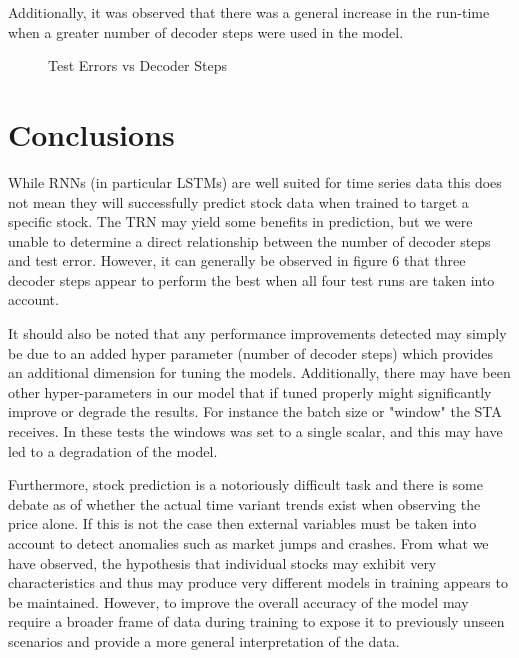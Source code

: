 \documentclass{article}
\begin{document}
    
    Additionally, it was observed that there was a general increase in the run-time when a greater number of decoder steps were used in the model.


    \begin{figure}[H]
      \centering
      \begin{minipage}[b]{0.75	\textwidth}
        \caption{Test Errors vs Decoder Steps}
      \end{minipage}
    \end{figure}


\section{Conclusions}
    While RNNs (in particular LSTMs) are well suited for time series data this does not mean they will successfully predict stock data when trained to target a specific stock. The TRN may yield some benefits in prediction, but we were unable to determine a direct relationship between the number of decoder steps and test error. However, it can generally be observed in figure 6 that three decoder steps appear to perform the best when all four test runs are taken into account. 
    
    It should also be noted that any performance improvements detected may simply be due to an added hyper parameter (number of decoder steps) which provides an additional dimension for tuning the models. Additionally, there may have been other hyper-parameters in our model that if tuned properly might significantly improve or degrade the results. For instance the batch size or "window" the STA receives. In these tests the windows was set to a single scalar, and this may have led to a degradation of the model.
    
    Furthermore, stock prediction is a notoriously difficult task and there is some debate as of whether the actual time variant trends exist when observing the price alone. If this is not the case then external variables must be taken into account to detect anomalies such as market jumps and crashes. From what we have observed, the hypothesis that individual stocks may exhibit very characteristics and thus may produce very different models in training appears to be maintained. However, to improve the overall accuracy of the model may require a broader frame of data during training to expose it to previously unseen scenarios and provide a more general interpretation of the data.
\end{document}
